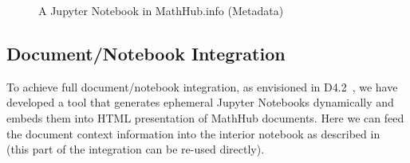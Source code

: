 \begin{figure}[ht]\centering
  \caption{A Jupyter Notebook in MathHub.info (Metadata)}\label{fig:mathhub-NB}
\end{figure}



\subsection{Document/Notebook Integration}

To achieve full document/notebook integration, as envisioned in D4.2~\cite{ODK-D4.2}, we have developed a tool that generates ephemeral Jupyter Notebooks dynamically and embeds them into HTML presentation of MathHub documents.
Here we can feed the document context information into the interior notebook as described in~\cite{ODK-D4.9} (this part of the integration can be re-used directly).

